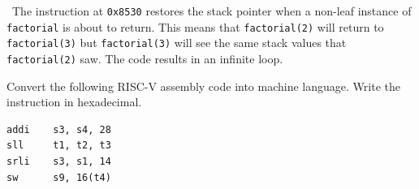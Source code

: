 \documentclass[12pt]{article}
\newenvironment{ex}[2][Exercise]{\begin{trivlist}
		\item[\hskip \labelsep {\bfseries #1}\hskip \labelsep {\bfseries #2.}]}{\end{trivlist}}
\newenvironment{sol}[1][Solution]{\begin{trivlist}
		\item[\hskip \labelsep {\bfseries #1:}]}{\end{trivlist}}
\begin{document}
\begin{sol}
\begin{enumerate}[label=(\alph*)]
		\
		The instruction at \texttt{0x8530} restores the stack pointer when
		a non-leaf instance of \texttt{factorial} is about to return.
		This means that \texttt{factorial(2)} will return to \texttt{factorial(3)}
		but \texttt{factorial(3)} will see the same stack values that
		\texttt{factorial(2)} saw. The code results in an infinite loop.
	\end{enumerate}
\end{sol}

\begin{ex}{6.22}
	Convert the following RISC-V assembly code into machine language. Write the
	instruction in hexadecimal.
	\begin{lstlisting}[language={}]
addi	s3,	s4,	28
sll		t1,	t2,	t3
srli	s3,	s1,	14
sw		s9,	16(t4)
	\end{lstlisting}
\end{ex}
\end{document}
